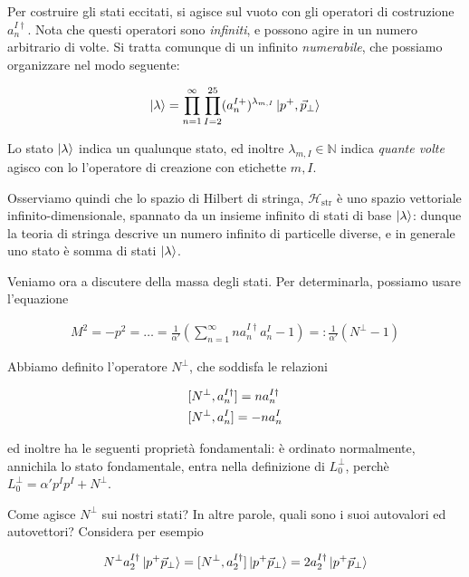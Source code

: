 \documentclass{report}
\begin{document}
Per costruire gli stati eccitati, si agisce sul vuoto con gli operatori di costruzione \(a^{I\dagger}_n\). Nota che questi operatori sono \emph{infiniti}, e possono agire in un numero arbitrario di volte. Si tratta comunque di un infinito \emph{numerabile}, che possiamo organizzare nel modo seguente: 

\begin{align}
    \ket{\lambda} = \prod_{n=1}^\infty \prod_{I=2}^{25}(a_n^{I+})^{\lambda_{m, I}}\ket{p^+, \vec{p}_\perp}
\end{align}

Lo stato \(\ket{\lambda}\) indica un qualunque stato, ed inoltre \(\lambda_{m, I} \in \mathbb{N}\) indica \emph{quante volte} agisco con lo l'operatore di creazione con etichette \(m, I\). 

Osserviamo quindi che lo spazio di Hilbert di stringa, \(\mathcal{H}_{\text{str}}\) è uno spazio vettoriale infinito-dimensionale, spannato da un insieme infinito di stati di base \(\ket{\lambda}\): dunque la teoria di stringa descrive un numero infinito di particelle diverse, e in generale uno stato è somma di stati \(\ket{\lambda}\). 

Veniamo ora a discutere della massa degli stati. Per determinarla, possiamo usare l'equazione 

\begin{align}
    M^2 = -p^2 = \ldots = \frac{1}{\alpha'}\left(\sum_{n=1}^{\infty} na_n^{I\dagger}a_n^I -1\right) =: \frac{1}{\alpha'}(N^\perp -1)
\end{align}

Abbiamo definito l'operatore \(N^\perp\), che soddisfa le relazioni 

\begin{align}
    &[N^\perp, a_n^{I\dagger}] = na_n^{I\dagger} \notag \\
    &[N^\perp, a_n^I] = -na_n^I 
\end{align}

ed inoltre ha le seguenti proprietà fondamentali: è ordinato normalmente, annichila lo stato fondamentale, entra nella definizione di \(L_0^\perp\), perchè \(L_0^\perp = \alpha' p^I p^I +N^\perp\). 

Come agisce \(N^\perp\) sui nostri stati? In altre parole, quali sono i suoi autovalori ed autovettori? Considera per esempio 

\begin{align}
    N^\perp a_2^{I\dagger}\ket{p^+ \vec{p}_\perp} = [N^\perp, a_2^{I\dagger}]\ket{p^+ \vec{p}_\perp} = 2a_2^{I\dagger}\ket{p^+ \vec{p}_\perp}
\end{align}
\end{document}
